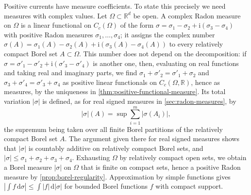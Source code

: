 Positive currents have measure coefficients. To state this precisely we need measures with complex values. Let $\Omega\subset\mathbb R^d$ be open. A complex Radon measure on $\Omega$ is a linear functional on $C_c(\Omega)$ of the form $\sigma=\sigma_1-\sigma_2+\mathrm{i}(\sigma_3-\sigma_4)$ with positive Radon measures $\sigma_1,\ldots,\sigma_4$; it assigns the complex number $\sigma(A)=\sigma_1(A)-\sigma_2(A)+\mathrm i(\sigma_3(A)-\sigma_4(A))$ to every relatively compact Borel set $A\subset\Omega$. This number does not depend on the decomposition: if $\sigma=\sigma'_1-\sigma'_2+\mathrm i(\sigma'_3-\sigma'_4)$ is another one, then, evaluating on real functions and taking real and imaginary parts, we find $\sigma_1+\sigma'_2=\sigma'_1+\sigma_2$ and $\sigma_3+\sigma'_4=\sigma'_3+\sigma_4$ as positive linear functionals on $C_c(\Omega,\mathbb R)$, hence as measures, by the uniqueness in \cref{thm:positive-functional-measure}. Its total variation $|\sigma|$ is defined, as for real signed measures in \cref{sec:radon-measures}, by
\[
 |\sigma|(A)=\sup\sum_{i=1}^m|\sigma(A_i)|,
\]
the supremum being taken over all finite Borel partitions of the relatively compact Borel set $A$. The argument given there for real signed measures shows that $|\sigma|$ is countably additive on relatively compact Borel sets, and $|\sigma|\leq\sigma_1+\sigma_2+\sigma_3+\sigma_4$. Exhausting $\Omega$ by relatively compact open sets, we obtain a Borel measure $|\sigma|$ on $\Omega$ that is finite on compact sets, hence a positive Radon measure by \cref{prop:borel-regularity}. Approximation by simple functions gives $|\int f\,\mathrm d\sigma|\leq\int|f|\,\mathrm d|\sigma|$ for bounded Borel functions $f$ with compact support.

